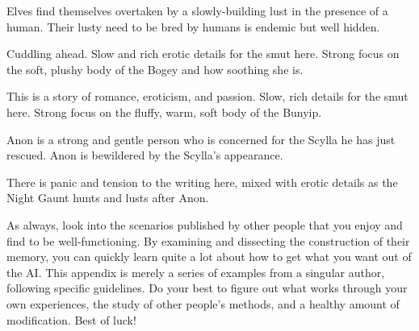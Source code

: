 \documentclass[Coomer-main.tex]{subfiles}
\begin{document}
\begin{/an}
Elves find themselves overtaken by a slowly-building lust in the presence of a human. Their lusty need to be bred by humans is endemic but well hidden.
\end{/an}

\begin{/an}
Cuddling ahead. Slow and rich erotic details for the smut here. Strong focus on the soft, plushy body of the Bogey and how soothing she is.
\end{/an}

\begin{/an}
This is a story of romance, eroticism, and passion. Slow, rich details for the smut here. Strong focus on the fluffy, warm, soft body of the Bunyip.
\end{/an}

\begin{/an}
Anon is a strong and gentle person who is concerned for the Scylla he has just rescued. Anon is bewildered by the Scylla's appearance.
\end{/an}

\begin{/an}
There is panic and tension to the writing here, mixed with erotic details as the Night Gaunt hunts and lusts after Anon.
\end{/an}

As always, look into the scenarios published by other people that you enjoy and find to be well-functioning. By examining and dissecting the construction of their memory, you can quickly learn quite a lot about how to get what you want out of the AI. This appendix is merely a series of examples from a singular author, following specific guidelines. Do your best to figure out what works through your own experiences, the study of other people’s methods, and a healthy amount of modification. Best of luck!
\end{document}
